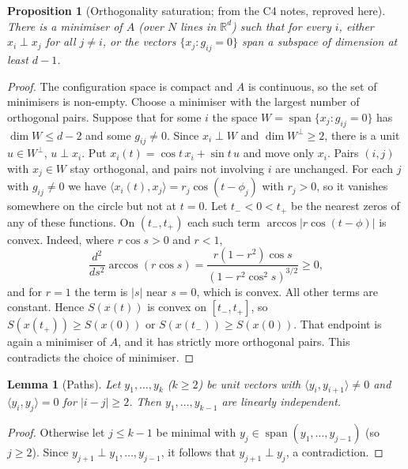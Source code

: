 \documentclass[11pt]{article}
\newtheorem{proposition}[theorem]{Proposition}
\newtheorem{lemma}[theorem]{Lemma}
\theoremstyle{remark}
\begin{document}
\begin{proposition}[Orthogonality saturation; from the C4 notes, reproved here]\label{prop:sat}
There is a minimiser of $A$ (over $N$ lines in $\mathbb R^d$) such
that for every $i$, either $x_i\perp x_j$ for all $j\ne i$, or the
vectors $\{x_j: g_{ij}=0\}$ span a subspace of dimension at least $d-1$.
\end{proposition}
\begin{proof}
The configuration space is compact and $A$ is continuous, so the set
of minimisers is non-empty. Choose a minimiser with the largest number of
orthogonal pairs. Suppose that for some $i$ the space
$W=\operatorname{span}\{x_j:g_{ij}=0\}$ has $\dim W\le d-2$ and some
$g_{ij}\ne0$. Since $x_i\perp W$ and $\dim W^\perp\ge2$, there is a unit $u\in W^\perp$,
$u\perp x_i$. Put $x_i(t)=\cos t\,x_i+\sin t\,u$ and move only $x_i$.
Pairs $(i,j)$ with $x_j\in W$ stay orthogonal, and pairs not involving
$i$ are unchanged. For each $j$ with $g_{ij}\ne0$ we have
$\langle x_i(t),x_j\rangle=r_j\cos(t-\phi_j)$ with $r_j>0$, so it
vanishes somewhere on the circle but not at $t=0$. Let $t_-<0<t_+$ be
the nearest zeros of any of these functions. On $(t_-,t_+)$ each such
term $\arccos|r\cos(t-\phi)|$ is convex. Indeed, where $r\cos s>0$ and $r<1$,
\[
\frac{d^2}{ds^2}\arccos(r\cos s)=\frac{r(1-r^2)\cos s}{(1-r^2\cos^2s)^{3/2}}\ge0,
\]
and for $r=1$ the term is $|s|$ near $s=0$, which is convex. All other terms
are constant. Hence $S(x(t))$ is convex on $[t_-,t_+]$, so
$S(x(t_+))\ge S(x(0))$ or $S(x(t_-))\ge S(x(0))$. That endpoint is again a
minimiser of $A$, and it has strictly more orthogonal pairs. This contradicts the choice of minimiser.
\end{proof}

\begin{lemma}[Paths]\label{lem:path}
Let $y_1,\dots,y_k$ ($k\ge2$) be unit vectors with
$\langle y_i,y_{i+1}\rangle\ne0$ and $\langle y_i,y_j\rangle=0$ for
$|i-j|\ge2$. Then $y_1,\dots,y_{k-1}$ are linearly independent.
\end{lemma}
\begin{proof}
Otherwise let $j\le k-1$ be minimal with
$y_j\in\operatorname{span}(y_1,\dots,y_{j-1})$ (so $j\ge2$). Since
$y_{j+1}\perp y_1,\dots,y_{j-1}$, it follows that $y_{j+1}\perp y_j$, a contradiction.
\end{proof}
\end{document}
